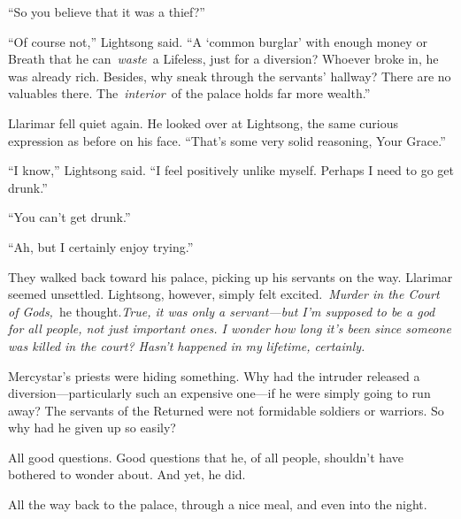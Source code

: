 “So you believe that it was a thief?”

“Of course not,” Lightsong said. “A ‘common burglar’ with enough money or Breath that he can~\textit{waste}~a Lifeless, just for a diversion? Whoever broke in, he was already rich. Besides, why sneak through the servants’ hallway? There are no valuables there. The~\textit{interior}~of the palace holds far more wealth.”

Llarimar fell quiet again. He looked over at Lightsong, the same curious expression as before on his face. “That’s some very solid reasoning, Your Grace.”

“I know,” Lightsong said. “I feel positively unlike myself. Perhaps I need to go get drunk.”

“You can’t get drunk.”

“Ah, but I certainly enjoy trying.”

They walked back toward his palace, picking up his servants on the way. Llarimar seemed unsettled. Lightsong, however, simply felt excited.~\textit{Murder in the Court of Gods,}~he thought.\textit{True, it was only a servant—but I’m supposed to be a god for all people, not just important ones. I wonder how long it’s been since someone was killed in the court? Hasn’t happened in my lifetime, certainly.}

Mercystar’s priests were hiding something. Why had the intruder released a diversion—particularly such an expensive one—if he were simply going to run away? The servants of the Returned were not formidable soldiers or warriors. So why had he given up so easily?

All good questions. Good questions that he, of all people, shouldn’t have bothered to wonder about. And yet, he did.

All the way back to the palace, through a nice meal, and even into the night.


